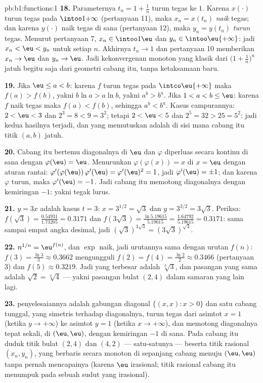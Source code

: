 \begin{solution}{pb:b1:functions:1}
\textbf{18.} Parameternya $t_n = 1 + \frac1n$ turun tegas
ke $1$. Karena $x(\cdot)$ turun tegas pada
$\intoo1{+\infty}$ (pertanyaan 11), maka $x_n = x(t_n)$ \emph{naik}
tegas; dan karena $y(\cdot)$ naik tegas di sana
(pertanyaan 12), maka $y_n = y(t_n)$ \emph{turun} tegas. Menurut
pertanyaan 7, $x_n \in \intoo1\eu$ dan $y_n \in
\intoo\eu{+\infty}$: jadi $x_n < \eu < y_n$ untuk setiap $n$. Akhirnya
$t_n \to 1$ dan pertanyaan 10 memberikan $x_n \to \eu$ dan $y_n \to \eu$.
Jadi kekonvergenan monoton yang klasik dari $\bigl(1 +
\frac1n\bigr)^n$ jatuh begitu saja dari geometri cabang itu, tanpa
ketaksamaan baru.

\textbf{19.} Jika $\eu \leq a < b$: karena $f$ turun tegas pada
$\intco\eu{+\infty}$ maka $f(a) > f(b)$, yakni $b\ln a > a\ln
b$, yakni $a^b > b^a$. Jika $1 < a < b \leq \eu$: karena $f$ naik
tegas maka $f(a) < f(b)$, sehingga $a^b < b^a$. Kasus campurannya:
$2 < \eu < 3$ dan $2^3 = 8 < 9 = 3^2$; tetapi $2 < \eu < 5$ dan
$2^5 = 32 > 25 = 5^2$: jadi kedua hasilnya terjadi, dan yang memutuskan adalah
di sisi mana cabang itu titik $(a, b)$ jatuh.

\textbf{20.} Cabang itu bertemu diagonalnya di $\eu$ dan $\varphi$
diperluas secara kontinu di sana dengan $\varphi(\eu) = \eu$.
Menurunkan $\varphi(\varphi(x)) = x$ di $x = \eu$ dengan
aturan rantai: $\varphi'(\varphi(\eu))\,\varphi'(\eu) =
\varphi'(\eu)^2 = 1$, jadi $\varphi'(\eu) = \pm1$; dan karena $\varphi$
turun, maka $\varphi'(\eu) = -1$. Jadi cabang itu memotong
diagonalnya dengan kemiringan $-1$: yakni tegak lurus.

\textbf{21.} $y = 3x$ adalah kasus $t = 3$: $x = 3^{1/2} = \sqrt3$
dan $y = 3^{3/2} = 3\sqrt3$. Periksa: $f(\sqrt3) =
\frac{0.54931}{1.73205} = 0.3171$ dan $f(3\sqrt3) =
\frac{\ln 5.19615}{5.19615} = \frac{1.64792}{5.19615} = 0.3171$:
sama sampai empat angka desimal, jadi $(\sqrt3)^{3\sqrt3} =
(3\sqrt3)^{\sqrt3}$.

\textbf{22.} $n^{1/n} = \eu^{f(n)}$, dan $\exp$ naik, jadi
urutannya sama dengan urutan $f(n)$: $f(3) = \frac{\ln3}3 \approx
0.3662$ mengungguli $f(2) = f(4) = \frac{\ln2}2 \approx 0.3466$ (pertanyaan
3) dan $f(5) \approx 0.3219$. Jadi yang terbesar adalah $\sqrt[3]3$, dan
pasangan yang sama adalah $\sqrt2 = \sqrt[4]4$ --- yakni pasangan bulat $(2, 4)$
dalam samaran yang lain lagi.

\textbf{23.}  penyelesaiannya adalah gabungan diagonal $\{(x,
x) : x > 0\}$ dan satu cabang tunggal, yang simetris terhadap diagonalnya,
turun tegas dari asimtot $x = 1$ (ketika $y \to
+\infty$) ke asimtot $y = 1$ (ketika $x \to +\infty$), dan memotong
diagonalnya tepat sekali, di $(\eu, \eu)$, dengan kemiringan $-1$
di sana. Pada cabang itu duduk titik bulat $(2, 4)$ dan $(4, 2)$
--- satu-satunya --- beserta titik rasional $(x_n, y_n)$,
yang berbaris secara monoton di sepanjang cabang menuju $(\eu, \eu)$
tanpa pernah mencapainya (karena $\eu$ irasional; titik rasional cabang itu
menumpuk pada sebuah sudut yang irasional).


\end{solution}
